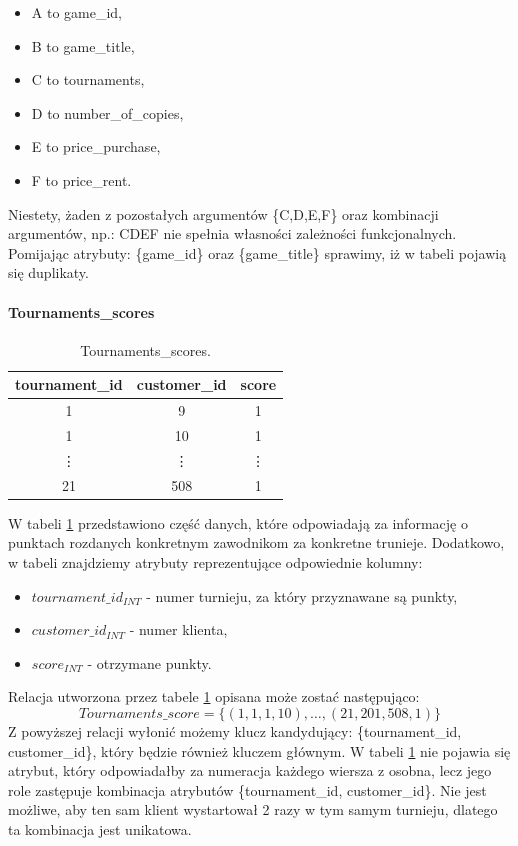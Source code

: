 \documentclass{article}
\theoremstyle{break}
\begin{document}
	\begin{itemize}
		\item A to game\_id,
		\item B to game\_title,
		\item C to tournaments,
		\item D to number\_of\_copies,
		\item E to price\_purchase,
		\item F to price\_rent.
	\end{itemize}
	Niestety, żaden z pozostałych argumentów \{C,D,E,F\} oraz kombinacji argumentów, np.: CDEF nie spełnia własności zależności funkcjonalnych. Pomijając atrybuty: \{game\_id\} oraz \{game\_title\} sprawimy, iż w tabeli pojawią się duplikaty.
		
		
	\paragraph{Tournaments\_scores}
	\begin{table}[!ht]
		\centering
		\begin{tabular}{|c|c|c|}
			\hline
			tournament\_id  & customer\_id & score \\ \hline
			1  & 9 & 1  \\ \hline
			1  & 10 & 1  \\ \hline
			\vdots  & \vdots & \vdots   \\ \hline
			21 & 508 & 1  \\ \hline
		\end{tabular}
		\caption{Tournaments\_scores.}
		\label{table:tournaments_scores}
	\end{table}
	W tabeli \ref{table:tournaments_scores} przedstawiono część danych, które odpowiadają za informację o punktach rozdanych konkretnym zawodnikom za konkretne trunieje. Dodatkowo, w tabeli znajdziemy atrybuty reprezentujące odpowiednie kolumny:
	\begin{itemize}
		\item $tournament\_id_{INT}$ - numer turnieju, za który przyznawane są punkty,
		\item $customer\_id_{INT}$ - numer klienta,
		\item $score_{INT}$ - otrzymane punkty.
	\end{itemize}
	Relacja utworzona przez tabele \ref{table:tournaments_scores} opisana może zostać następująco:
	$$Tournaments\_score = \{(1,1,1,10), \dots, (21,201,508,1)\}$$
	Z powyższej relacji wyłonić możemy klucz kandydujący: \{tournament\_id, customer\_id\}, który będzie również kluczem głównym. W tabeli \ref{table:tournaments_scores} nie pojawia się atrybut, który odpowiadałby za numeracja każdego wiersza z osobna, lecz jego role zastępuje kombinacja atrybutów \{tournament\_id, customer\_id\}. Nie jest możliwe, aby ten sam klient wystartował 2 razy w tym samym turnieju, dlatego ta kombinacja jest unikatowa.
\end{document}

